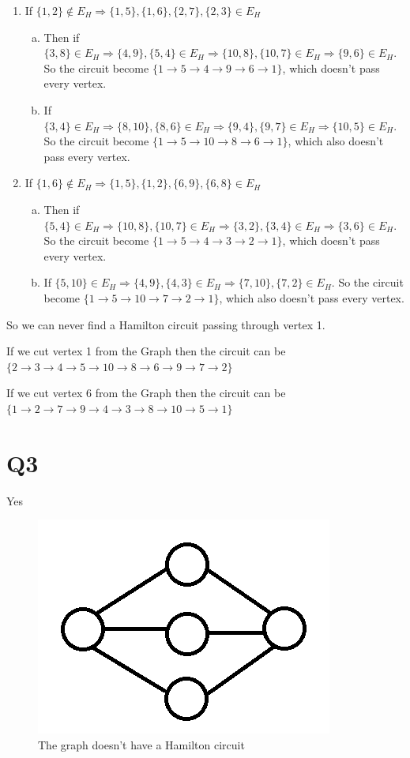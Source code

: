 \documentclass[12pt]{article}
\begin{document}
\begin{enumerate}
\item If $\{1,2\}\notin E_H\Rightarrow\{1,5\},\{1,6\},\{2,7\},\{2,3\}\in E_H$
\begin{enumerate}[(a)]
\item Then if $\{3,8\}\in E_H\Rightarrow\{4,9\},\{5,4\}\in E_H\Rightarrow\{10,8\},\{10,7\}\in E_H\Rightarrow\{9,6\}\in E_H.$ So the circuit become $\{1\rightarrow5\rightarrow4\rightarrow9\rightarrow6\rightarrow1\}$, which doesn't pass every vertex. 
\item If $\{3,4\}\in E_H\Rightarrow\{8,10\},\{8,6\}\in E_H\Rightarrow\{9,4\},\{9,7\}\in E_H\Rightarrow\{10,5\}\in E_H.$ So the circuit become $\{1\rightarrow5\rightarrow10\rightarrow8\rightarrow6\rightarrow1\}$, which also doesn't pass every vertex. 
\end{enumerate}
\item If $\{1,6\}\notin E_H\Rightarrow\{1,5\},\{1,2\},\{6,9\},\{6,8\}\in E_H$
\begin{enumerate}[(a)]
\item Then if $\{5,4\}\in E_H\Rightarrow\{10,8\},\{10,7\}\in E_H\Rightarrow\{3,2\},\{3,4\}\in E_H\Rightarrow\{3,6\}\in E_H.$ So the circuit become $\{1\rightarrow5\rightarrow4\rightarrow3\rightarrow2\rightarrow1\}$, which doesn't pass every vertex. 
\item If $\{5,10\}\in E_H\Rightarrow\{4,9\},\{4,3\}\in E_H\Rightarrow\{7,10\},\{7,2\}\in E_H.$ So the circuit become $\{1\rightarrow5\rightarrow10\rightarrow7\rightarrow2\rightarrow1\}$, which also doesn't pass every vertex. 
\end{enumerate}
\end{enumerate}
So we can never find a Hamilton circuit passing through vertex 1.
\par If we cut vertex 1 from the Graph then the circuit can be $\{2\rightarrow3\rightarrow4\rightarrow5\rightarrow10\rightarrow8\rightarrow6\rightarrow9\rightarrow7\rightarrow2\}$
\par If we cut vertex 6 from the Graph then the circuit can be $
\{1\rightarrow2\rightarrow7\rightarrow9\rightarrow4\rightarrow3\rightarrow8\rightarrow10\rightarrow5\rightarrow1\}$
\section{Q3}
Yes
\begin{figure}[H]
\centering
\includegraphics[scale=0.3]{P5.jpg}
\caption{The graph doesn't have a Hamilton circuit}
\end{figure} 
\end{document}
